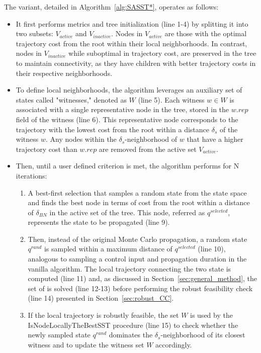The  variant, detailed in Algorithm~\ref{alg:SASST*}, operates as follows:
\begin{itemize}
    \item It first performs metrics and tree initialization (line 1-4) by splitting it into two subsets: $V_{active}$ and $V_{inactive}.$
    Nodes in $V_{active}$ are those with the optimal trajectory cost from the root within their local neighborhoods. 
    In contrast, nodes in $V_{inactive}$ while suboptimal in trajectory cost, are preserved in the tree to maintain connectivity, as they have children with better trajectory costs in their respective neighborhoods. 
    \item To define local neighborhoods, the algorithm leverages an auxiliary set of states called "witnesses," denoted as $W$ (line 5). 
    Each witness $w \in W$ is associated with a single representative node in the tree, stored in the $w.rep$ field of the witness (line 6).
    This representative node corresponds to the trajectory with the lowest cost from the root within a distance $\delta_s$ of the witness $w$.
    Any nodes within the $\delta_s$-neighborhood of $w$ that have a higher trajectory cost than $w.rep$ are removed from the active set $V_{active}$.
    \item Then, until a user defined criterion is met, the algorithm performs for N iterations:
    \begin{enumerate}
        \item A best-first selection that samples a random state from the state space and finds the best node in terms of cost from the root within a distance of $\delta_{BN}$ in the active set of the tree. 
        This node, referred as $q^{selected}$, represents the state to be propagated (line 9).
        \item Then, instead of the original Monte Carlo propagation, a random state $q^{rand}$ is sampled within a maximum distance of $q^{selected}$ (line 10), analogous to sampling a control input and propagation duration in the vanilla algorithm.
        The local trajectory connecting the two state is computed (line 11) and, as discussed in Section~\ref{sec:general_method}, the set of  is solved (line 12-13) before performing the robust feasibility check (line 14) presented in Section~\ref{sec:robust_CC}.
        \item If the local trajectory is robustly feasible, the set $W$ is used by the IsNodeLocallyTheBestSST procedure (line 15) to check whether the newly sampled state $q^{rand}$ dominates the $\delta_s$-neighborhood of its closest witness and to update the witness set $W$ accordingly.

\end{enumerate}
\end{itemize}
